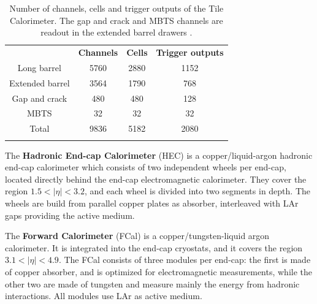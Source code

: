 \begin{table}[!ht]
  \begin{center}
    \begin{small}
      \setlength{\tabcolsep}{0.0pc}
      \begin{tabular*}{\textwidth}{@{\extracolsep{\fill}}cccc}
        \noalign{\smallskip}\hline\hline\noalign{\smallskip}
                                     & \textbf{Channels} & \textbf{Cells} & \textbf{Trigger outputs} \\
        \noalign{\smallskip}\hline\noalign{\smallskip}
        Long barrel                  & 5760 & 2880 & 1152 \\
        Extended barrel              & 3564 & 1790 & 768 \\
        Gap and crack                & 480 & 480 & 128 \\
        MBTS                         & 32 & 32 & 32 \\
        \noalign{\smallskip}\hline\noalign{\smallskip}
        Total                        & 9836 & 5182 & 2080 \\
        \noalign{\smallskip}\hline\hline\noalign{\smallskip}
      \end{tabular*}
    \end{small}
  \end{center}
  \caption[Number of channels, cells and trigger outputs of the Tile Calorimeter.]{Number of channels, cells and trigger outputs of the Tile Calorimeter. The gap and crack and MBTS channels are readout in the extended barrel drawers \protect\cite{Aad:2010af}.}
  \label{tab:TileCalCells}
\end{table}

The {\bf Hadronic End-cap Calorimeter} (HEC) is a copper/liquid-argon hadronic end-cap calorimeter which consists of two independent wheels per end-cap, located directly behind the end-cap electromagnetic calorimeter.
They cover the region $1.5<|\eta|<3.2$, and each wheel is divided into two segments in depth.
The wheels are build from parallel copper plates as absorber, interleaved with LAr gaps providing the active medium.

The {\bf Forward Calorimeter} (FCal) is a copper/tungsten-liquid argon calorimeter. 
It is integrated into the end-cap cryostats, and it covers the region $3.1<|\eta|<4.9$.
The FCal consists of three modules per end-cap: the first is made of copper absorber, and is optimized for electromagnetic measurements, while the other two are made of tungsten and measure mainly the energy from hadronic interactions. 
All modules use LAr as active medium.

